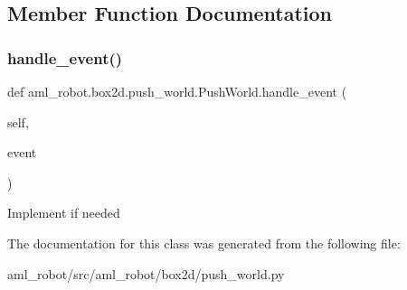 \subsection{Member Function Documentation}
\hypertarget{classaml__robot_1_1box2d_1_1push__world_1_1_push_world_a3795cb626fde3df305543dbc8d7e2899}{}\label{classaml__robot_1_1box2d_1_1push__world_1_1_push_world_a3795cb626fde3df305543dbc8d7e2899} 
\subsubsection{\texorpdfstring{handle\+\_\+event()}{handle\_event()}}
{\footnotesize\ttfamily def aml\+\_\+robot.\+box2d.\+push\+\_\+world.\+Push\+World.\+handle\+\_\+event (\begin{DoxyParamCaption}\item[{}]{self,  }\item[{}]{event }\end{DoxyParamCaption})}

\begin{DoxyVerb}Implement if needed \end{DoxyVerb}
 

The documentation for this class was generated from the following file\+:\begin{DoxyCompactItemize}
\item 
aml\+\_\+robot/src/aml\+\_\+robot/box2d/push\+\_\+world.\+py\end{DoxyCompactItemize}
